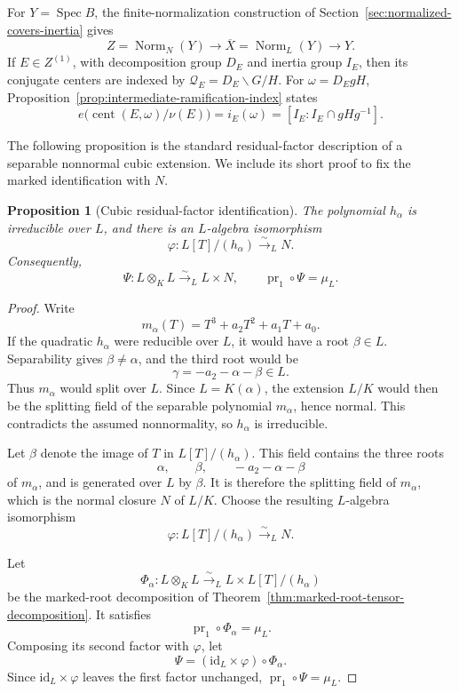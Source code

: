 \documentclass[11pt]{article}
\newtheorem{proposition}[theorem]{Proposition}
\theoremstyle{remark}
\theoremstyle{definition}
\DeclareMathOperator{\Spec}{Spec}
\DeclareMathOperator{\Norm}{Norm}
\newcommand{\id}{\mathrm{id}}
\begin{document}
For \(Y=\Spec B\), the finite-normalization construction of
Section~\ref{sec:normalized-covers-inertia} gives
\[
  Z=\Norm_N(Y)\longrightarrow
  \overline X=\Norm_L(Y)\longrightarrow Y.
\]
If \(E\in Z^{(1)}\), with decomposition group \(D_E\) and inertia group
\(I_E\), then its conjugate centers are indexed by
\(\mathcal Q_E=D_E\backslash G/H\).  For
\(\omega=D_EgH\), Proposition~\ref{prop:intermediate-ramification-index}
states
\[
  e\bigl(\operatorname{cent}(E,\omega)/\nu(E)\bigr)
  =
  i_E(\omega)
  =
  [I_E:I_E\cap gHg^{-1}].
\]

The following proposition is the standard residual-factor description
of a separable nonnormal cubic extension.  We include its short proof
to fix the marked identification with \(N\).

\begin{proposition}[Cubic residual-factor identification]
\label{prop:cubic-tensor-decomposition}
The polynomial \(h_\alpha\) is irreducible over \(L\), and there is an
\(L\)-algebra isomorphism
\[
  \varphi\colon L[T]/(h_\alpha)\xrightarrow{\sim}_L N.
\]
Consequently,
\[
  \Psi\colon L\otimes_KL\xrightarrow{\sim}_L L\times N,
  \qquad
  \operatorname{pr}_1\circ\Psi=\mu_L.
\]
\end{proposition}

\begin{proof}
Write
\[
  m_\alpha(T)=T^3+a_2T^2+a_1T+a_0.
\]
If the quadratic \(h_\alpha\) were reducible over \(L\), it would have a
root \(\beta\in L\).  Separability gives \(\beta\neq\alpha\), and the
third root would be
\[
  \gamma=-a_2-\alpha-\beta\in L.
\]
Thus \(m_\alpha\) would split over \(L\).  Since
\(L=K(\alpha)\), the extension \(L/K\) would then be the splitting
field of the separable polynomial \(m_\alpha\), hence normal.  This
contradicts the assumed nonnormality, so \(h_\alpha\) is irreducible.

Let \(\beta\) denote the image of \(T\) in \(L[T]/(h_\alpha)\).  This
field contains the three roots
\[
  \alpha,\qquad \beta,\qquad -a_2-\alpha-\beta
\]
of \(m_\alpha\), and is generated over \(L\) by \(\beta\).  It is
therefore the splitting field of \(m_\alpha\), which is the normal
closure \(N\) of \(L/K\).  Choose the resulting \(L\)-algebra
isomorphism
\[
  \varphi\colon L[T]/(h_\alpha)\xrightarrow{\sim}_L N.
\]

Let
\[
  \Phi_\alpha\colon
  L\otimes_KL
  \xrightarrow{\sim}_L
  L\times L[T]/(h_\alpha)
\]
be the marked-root decomposition of
Theorem~\ref{thm:marked-root-tensor-decomposition}.  It satisfies
\[
  \operatorname{pr}_1\circ\Phi_\alpha=\mu_L.
\]
Composing its second factor with \(\varphi\), let
\[
  \Psi=(\id_L\times\varphi)\circ\Phi_\alpha.
\]
Since \(\id_L\times\varphi\) leaves the first factor unchanged,
\(\operatorname{pr}_1\circ\Psi=\mu_L\).
\end{proof}
\end{document}
